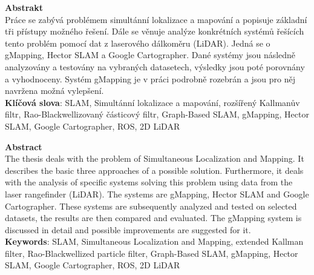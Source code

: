 \documentclass[12pt]{report}
\begin{document}
\newpage

\noindent\textbf{\Large{Abstrakt}}\\

\noindent Práce se zabývá problémem simultánní lokalizace a mapování a popisuje základní tři přístupy možného řešení. Dále se věnuje analýze konkrétních systémů řešících tento problém pomocí dat z laserového dálkoměru (LiDAR). Jedná se o gMapping, Hector SLAM a Google Cartographer. Dané systémy jsou následně analyzovány a testovány na vybraných datasetech, výsledky jsou poté porovnány a vyhodnoceny. Systém gMapping je v práci podrobně rozebrán a jsou pro něj navržena možná vylepšení.\\

\noindent\textbf{Klíčová slova}: SLAM, Simultánní lokalizace a mapování, rozšířený Kallmanův filtr, Rao-Blackwellizovaný částicový filtr, Graph-Based SLAM, gMapping, Hector SLAM, Google Cartographer, ROS, 2D LiDAR\\
\newline\newline\newline


\noindent\textbf{\Large{Abstract}}\\

\noindent The thesis deals with the problem of Simultaneous Localization and Mapping. It describes the basic three approaches of a possible solution. Furthermore, it deals with the analysis of specific systems solving this problem using data from the laser rangefinder (LiDAR). The systems are gMapping, Hector SLAM and Google Cartographer. These systems are subsequently analyzed and tested on selected datasets, the results are then compared and evaluated. The gMapping system is discussed in detail and possible improvements are suggested for it.\\

\noindent\textbf{Keywords}: SLAM, Simultaneous Localization and Mapping, extended Kallman filter, Rao-Blackwellized particle filter, Graph-Based SLAM, gMapping, Hector SLAM, Google Cartographer, ROS, 2D LiDAR

\newpage	
	
\tableofcontents
\newpage
\end{document}
